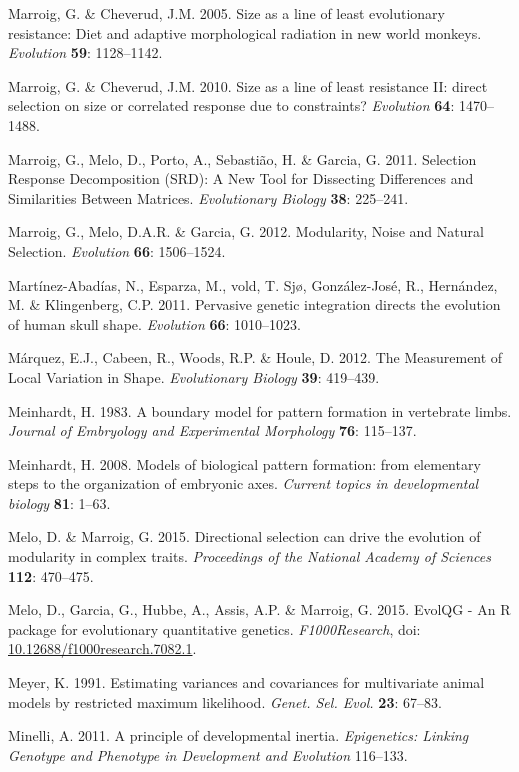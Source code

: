 \documentclass[12pt,twoside]{report}
\begin{document}
Marroig, G. \& Cheverud, J.M. 2005. Size as a line of least evolutionary
resistance: Diet and adaptive morphological radiation in new world
monkeys. \emph{Evolution} \textbf{59}: 1128--1142.

Marroig, G. \& Cheverud, J.M. 2010. Size as a line of least resistance
II: direct selection on size or correlated response due to constraints?
\emph{Evolution} \textbf{64}: 1470--1488.

Marroig, G., Melo, D., Porto, A., Sebastião, H. \& Garcia, G. 2011.
Selection Response Decomposition (SRD): A New Tool for Dissecting
Differences and Similarities Between Matrices. \emph{Evolutionary
Biology} \textbf{38}: 225--241.

Marroig, G., Melo, D.A.R. \& Garcia, G. 2012. Modularity, Noise and
Natural Selection. \emph{Evolution} \textbf{66}: 1506--1524.

Martínez-Abadías, N., Esparza, M., vold, T. Sjø, González-José, R.,
Hernández, M. \& Klingenberg, C.P. 2011. Pervasive genetic integration
directs the evolution of human skull shape. \emph{Evolution}
\textbf{66}: 1010--1023.

Márquez, E.J., Cabeen, R., Woods, R.P. \& Houle, D. 2012. The
Measurement of Local Variation in Shape. \emph{Evolutionary Biology}
\textbf{39}: 419--439.

Meinhardt, H. 1983. A boundary model for pattern formation in vertebrate
limbs. \emph{Journal of Embryology and Experimental Morphology}
\textbf{76}: 115--137.

Meinhardt, H. 2008. Models of biological pattern formation: from
elementary steps to the organization of embryonic axes. \emph{Current
topics in developmental biology} \textbf{81}: 1--63.

Melo, D. \& Marroig, G. 2015. Directional selection can drive the
evolution of modularity in complex traits. \emph{Proceedings of the
National Academy of Sciences} \textbf{112}: 470--475.

Melo, D., Garcia, G., Hubbe, A., Assis, A.P. \& Marroig, G. 2015. EvolQG
- An R package for evolutionary quantitative genetics.
\emph{F1000Research}, doi:
\href{http://dx.doi.org/10.12688/f1000research.7082.1}{10.12688/f1000research.7082.1}.

Meyer, K. 1991. Estimating variances and covariances for multivariate
animal models by restricted maximum likelihood. \emph{Genet. Sel. Evol.}
\textbf{23}: 67--83.

Minelli, A. 2011. A principle of developmental inertia.
\emph{Epigenetics: Linking Genotype and Phenotype in Development and
Evolution} 116--133.
\end{document}
